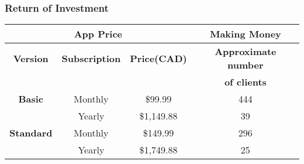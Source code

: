\subsubsection{Return of Investment}
\begin{center}
    \begin{tabular}{|c|c|c|c|}
        \hline
        \multicolumn{3}{|c|}{\textbf{App Price}} & \textbf{Making Money} \\
        \hline
        \textbf{Version} & \textbf{Subscription} & \textbf{Price(CAD)} & \textbf{Approximate number} \\
        & & & \textbf{of clients} \\
        \hline
        \textbf{Basic} & Monthly & \$99.99 & 444 \\
        \hline
        & Yearly & \$1,149.88 & 39 \\
        \hline
        \textbf{Standard} & Monthly & \$149.99 & 296 \\
        \hline
        & Yearly & \$1,749.88 & 25 \\
        \hline
    \end{tabular}
\end{center}